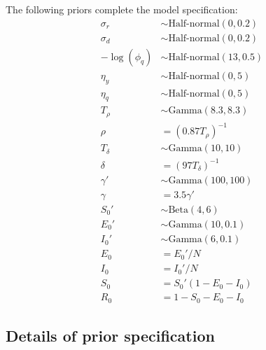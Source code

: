 \documentclass[12pt,letterpaper]{article}
\begin{document}
The following priors complete the model specification:
\begin{align}
\sigma_r & \sim \text{Half-normal}(0, 0.2)\\
\sigma_d & \sim \text{Half-normal}(0, 0.2)\\
-\log(\phi_q) & \sim \text{Half-normal}(13, 0.5)\\
\eta_y &\sim \text{Half-normal}(0, 5)\\
\eta_q & \sim \text{Half-normal}(0, 5)\\
T_{\rho} & \sim \text{Gamma}(8.3, 8.3)\\
\rho & = (0.87 T_{\rho})^{-1}\\
T_{\delta} & \sim \text{Gamma}(10, 10)\\
\delta & = (97 T_{\delta})^{-1}\\
\gamma' & \sim \text{Gamma}(100, 100)\\
\gamma & = 3.5\gamma'\\
S_0' & \sim \text{Beta}(4, 6)\\
E_0' & \sim \text{Gamma}(10, 0.1)\\
I_0' & \sim \text{Gamma}(6, 0.1)\\
E_0 & = E_0' / N \\
I_0 & = I_0' / N \\ 
S_0 & = S_0'(1 - E_0 - I_0) \\
R_0 & = 1 - S_0 - E_0 - I_0
\end{align}

\subsection*{Details of prior specification}
\end{document}
